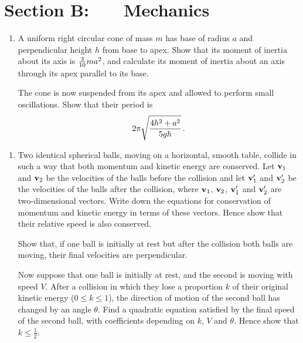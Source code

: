 \documentclass[a4, 11pt]{report}
\newlength{\qspace}
\newcounter{qnumber}
\newenvironment{question}%
 {\vspace{\qspace}
  \begin{enumerate}[\bfseries 1\quad][10]%
    \setcounter{enumi}{\value{qnumber}}%
    \item%
 }
{
  \end{enumerate}
  \filbreak
  \stepcounter{qnumber}
 }
\def\le{\leqslant}
\begin{document}
		
	
\newpage
\section*{Section B: \ \ \ Mechanics}


	
\begin{question}
A uniform right circular cone of mass $m$ has 
base of radius $a$ and perpendicular
height $h$ from base to apex. 
Show that its moment of inertia about its axis is ${3\over 10} ma^2$, 
and calculate its moment of inertia about an axis through
its apex parallel to its base.

The cone is now suspended from its apex and allowed
to perform small oscillations. Show that their
period is
$$
2\pi\sqrt{ 4h^2 + a^2\over 5gh} \,.
$$
	\end{question}
	
\begin{question}	
Two identical spherical balls, moving on a horizontal, smooth table, collide
in such a way that both momentum and kinetic energy are conserved. 
Let ${\bf v}_1$ and ${\bf v}_2$ be the
 velocities of the balls before the collision 
and let ${\bf v}'_1$ and ${\bf v}'_2$ be 
the velocities of the balls after the collision, where
  ${\bf v}_1$, ${\bf v}_2$, ${\bf v}'_1$ and ${\bf v}'_2$ are two-dimensional 
vectors. Write down 
the equations for conservation of momentum and kinetic energy in terms of 
these vectors. Hence show that their relative speed is also conserved.

Show that, if one ball is initially at rest but after the collision
both balls are moving, their final velocities are perpendicular.

Now suppose that one ball is initially at rest, and the second is
moving with speed $V$. After a collision in which they lose
a proportion $k$ of their original kinetic energy ($0\le k\le 1$), 
the direction of motion of the second ball has changed by an angle 
$\theta$. Find a quadratic equation satisfied by the final speed of the 
second ball, with coefficients depending on $k$, $V$ and $\theta$. 
Hence show that $k\le \frac{1}{2}$.
\end{question}

\end{document}

